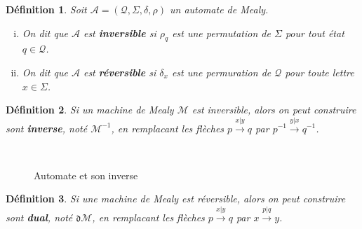 \documentclass[11pt,a4paper]{article}
\newtheorem{definition}{Définition}
\begin{document}
\begin{definition}
  Soit $\mathcal{A}=\left(\mathcal{Q}, \Sigma, \delta, \rho\right)$ un automate de Mealy.
  \begin{enumerate}[(i)]
  \item On dit que $\mathcal{A}$ est \textbf{inversible} si $\rho_q$ est une permutation de $\Sigma$ pour tout état $q\in\mathcal{Q}$.
  \item On dit que $\mathcal{A}$ est \textbf{réversible} si $\delta_x$ est une permuration de $\mathcal{Q}$ pour toute lettre $x\in\Sigma$.
  \end{enumerate}
\end{definition}

\begin{definition}
  Si un machine de Mealy $\mathcal{M}$ est inversible, alors on peut construire sont \textbf{\textit{inverse}}, noté $\mathcal{M}^{-1}$, en remplacant les flèches $p\overset{x|y}{\longrightarrow}q$ par $p^{-1}\overset{y|x}{\longrightarrow}q^{-1}$.
\end{definition}


\begin{figure}[h!]
  \centering
  \scalebox{.9} {
  \begin{subfigure}[b]{0.5\textwidth}
    \centering
  \end{subfigure}
  ~
  \begin{subfigure}[b]{0.5\textwidth}
    \centering
  \end{subfigure}
  }
  \caption{Automate et son inverse}
\end{figure}


\begin{definition}
  Si une machine de Mealy est réversible, alors on peut construire sont \textbf{\textit{dual}}, noté $\mathfrak{d}\mathcal{M}$, en remplacant les flèches $p\overset{x|y}{\longrightarrow}q$ par $x\overset{p|q}{\longrightarrow}y$.
\end{definition}
\end{document}

